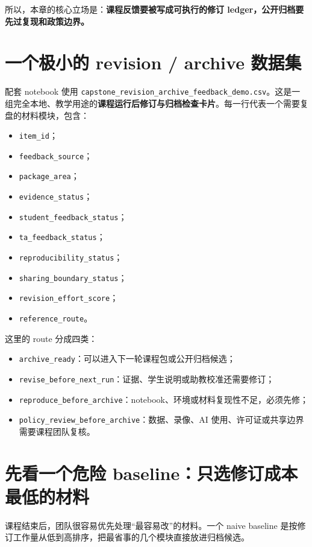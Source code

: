 所以，本章的核心立场是：\textbf{课程反馈要被写成可执行的修订 ledger，公开归档要先过复现和政策边界。}

\section{一个极小的 revision / archive 数据集}

配套 notebook 使用 \nolinkurl{capstone_revision_archive_feedback_demo.csv}。这是一组完全本地、教学用途的\textbf{课程运行后修订与归档检查卡片}。每一行代表一个需要复盘的材料模块，包含：

\begin{itemize}
    \item \texttt{item\_id}；
    \item \texttt{feedback\_source}；
    \item \texttt{package\_area}；
    \item \texttt{evidence\_status}；
    \item \texttt{student\_feedback\_status}；
    \item \texttt{ta\_feedback\_status}；
    \item \texttt{reproducibility\_status}；
    \item \texttt{sharing\_boundary\_status}；
    \item \texttt{revision\_effort\_score}；
    \item \texttt{reference\_route}。
\end{itemize}

这里的 route 分成四类：

\begin{itemize}
    \item \texttt{archive\_ready}：可以进入下一轮课程包或公开归档候选；
    \item \texttt{revise\_before\_next\_run}：证据、学生说明或助教校准还需要修订；
    \item \texttt{reproduce\_before\_archive}：notebook、环境或材料复现性不足，必须先修；
    \item \texttt{policy\_review\_before\_archive}：数据、录像、AI 使用、许可证或共享边界需要课程团队复核。
\end{itemize}

\section{先看一个危险 baseline：只选修订成本最低的材料}

课程结束后，团队很容易优先处理“最容易改”的材料。一个 naive baseline 是按修订工作量从低到高排序，把最省事的几个模块直接放进归档候选。

